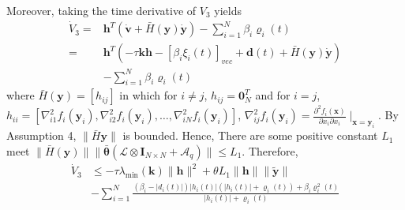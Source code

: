 \documentclass[lettersize,journal]{IEEEtran}
\begin{document}
\begin{IEEEproof}
    Moreover, taking the time derivative of $V_3$ yields
    \begin{equation}
        \begin{aligned}
            \dot{V}_3  = & {\mathbf{h}}^T(\dot{\mathbf{v}}+\bar{H}(\mathbf{y})\dot{\mathbf{y}}) - \sum_{i = 1}^{N} \beta_i\varrho_i(t)          \\
            =            & {\mathbf{h}}^T(-\tau\mathbf{k}\mathbf{h}-[\beta_i\xi_i(t)]_{vec}+\mathbf{d}(t) +\bar{H}(\mathbf{y})\dot{\mathbf{y}}) \\
                         & - \sum_{i = 1}^{N} \beta_i\varrho_i(t)
        \end{aligned}
    \end{equation}
    where $\bar{H}(\mathbf{y})=[h_{ij}]$ in which for $i \neq j$, $h_{ij} = \mathbf{0}_N^T$ and for $i = j$, $h_{ii}=[\nabla_{i1}^{2}f_{i}(\mathbf{y}_{i}),\nabla_{i2}^{2}f_{i}(\mathbf{y}_{i}),\ldots,\nabla_{iN}^{2}f_{i}(\mathbf{y}_{i})]$, $\nabla_{ij}^{2}f_{i}(\mathbf{y}_{i})=\frac{\partial^{2}f_{i}(\mathbf{x})}{\partial x_{i}\partial x_{i}}\mid_{\mathbf{x}=\mathbf{y}_{i}}$. By Assumption 4, $\|\bar{H}\mathbf{y}\|$ is bounded. Hence, There are some positive constant $L_1$ meet $\|\bar{H}(\mathbf{y})\|\|\bar{\boldsymbol{\theta}}(\mathcal{L}\otimes \mathbf{I}_{N\times N}+\mathcal{A}_{q})\|\leq L_{1}$. Therefore,
    \begin{equation}
        \begin{aligned}
            \dot{V}_3 & \leq-\tau\lambda_{\min}(\mathbf{k})\|{\mathbf{h}}\|^2+\theta L_1\|{\mathbf{h}}\|\|\tilde{\mathbf{y}}\|                       \\
                      & -\sum_{i = 1}^{N}\frac{(\beta_i - |d_i(t)|)|h_i(t)|(|h_i(t)|+\varrho_i(t)) + \beta_i\varrho_i^2(t)}{|h_i(t)| + \varrho_i(t)}
        \end{aligned}
    \end{equation}


\end{IEEEproof}
\end{document}
